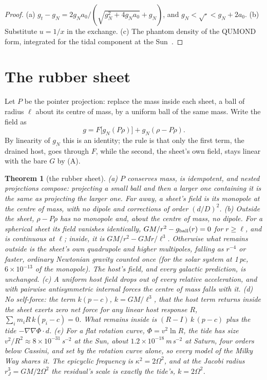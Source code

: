 \documentclass[twocolumn]{iopjournal}
\newtheorem{theorem}{Theorem}
\theoremstyle{definition}
\theoremstyle{remark}
\begin{document}
\begin{proof}
(a) $g_t - g_N = 2g_Na_0/(\sqrt{g_N^2 + 4g_Na_0} + g_N)$, and
$g_N < \sqrt{\cdot} < g_N + 2a_0$. (b) Substitute $u = 1/x$ in the
exchange. (c) The phantom density of the QUMOND form, integrated for
the tidal component at the Sun~\cite{Milgrom2010,NelsonBimetric}.
\end{proof}

\section*{The rubber sheet}

Let $P$ be the pointer projection: replace the mass inside each sheet, a
ball of radius $\ell$ about its centre of mass, by a uniform ball of the
same mass. Write the field as
\begin{equation}
  g = F\bigl[g_N(P\rho)\bigr] + g_N(\rho - P\rho). \label{eq:split}
\end{equation}
By linearity of $g_N$ this is an identity; the rule is that only the
first term, the drained host, goes through $F$, while the second, the
sheet's own field, stays linear with the bare $G$ by (A).

\begin{theorem}[the rubber sheet]\label{thm:sheet}
(a) $P$ conserves mass, is idempotent, and nested projections compose:
projecting a small ball and then a larger one containing it is the same
as projecting the larger one. Far away, a sheet's field is its monopole
at the centre of mass, with no dipole and corrections of order
$(d/D)^2$. (b) Outside the sheet, $\rho - P\rho$ has no monopole and, about
the centre of mass, no dipole. For a spherical sheet its field vanishes
identically, $GM/r^2 - g_{\rm ball}(r) = 0$ for $r \ge \ell$, and is
continuous at $\ell$; inside, it is $GM/r^2 - GMr/\ell^3$. Otherwise what
remains outside is the sheet's own quadrupole and higher multipoles,
falling as $r^{-4}$ or faster, ordinary Newtonian gravity counted once
(for the solar system at 1\,pc, $6\times10^{-13}$ of the monopole). The
host's field, and every galactic prediction, is unchanged.
(c) A uniform host field drops out of every relative acceleration, and
with pairwise antisymmetric internal forces the centre of mass falls
with it. (d) No self-force: the term $k(p - c)$, $k = GM/\ell^3$, that
the host term returns inside the sheet exerts zero net force for any
linear host response $R$, $\sum_i m_i R\,k(p_i - c) = 0$. What remains
inside is $(R - I)\,k\,(p - c)$ plus the tide $-\nabla\nabla\Phi\cdot d$.
(e) For a flat rotation curve, $\Phi = v^2\ln R$, the tide has size
$v^2/R^2 \approx 8 \times 10^{-31}$\,s$^{-2}$ at the Sun, about
$1.2 \times 10^{-18}$\,m\,s$^{-2}$ at Saturn, four orders below Cassini,
and set by the rotation curve alone, so every model of the Milky Way
shares it. The epicyclic frequency is $\kappa^2 = 2\Omega^2$, and at the
Jacobi radius $r_J^3 = GM/2\Omega^2$ the residual's scale is exactly the
tide's, $k = 2\Omega^2$.
\end{theorem}
\end{document}
